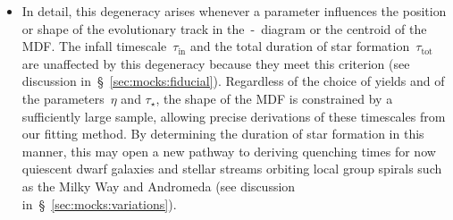 \documentclass[ms.tex]{subfiles}
\begin{document}
\begin{itemize}
	\item In detail, this degeneracy arises whenever a parameter influences
	the position or shape of the evolutionary track in the~\afe-\feh~diagram
	or the centroid of the MDF.
	The infall timescale~$\tau_\text{in}$ and the total duration of star
	formation~$\tau_\text{tot}$ are unaffected by this degeneracy because they
	meet this criterion (see discussion in~\S~\ref{sec:mocks:fiducial}).
	Regardless of the choice of yields and of the parameters~$\eta$ and
	$\tau_\star$, the shape of the MDF is constrained by a sufficiently large
	sample, allowing precise derivations of these timescales from our fitting
	method.
	By determining the duration of star formation in this manner, this may
	open a new pathway to deriving quenching times for now quiescent dwarf
	galaxies and stellar streams orbiting local group spirals such as the
	Milky Way and Andromeda (see discussion in~\S~\ref{sec:mocks:variations}).

\end{itemize}
\end{document}
